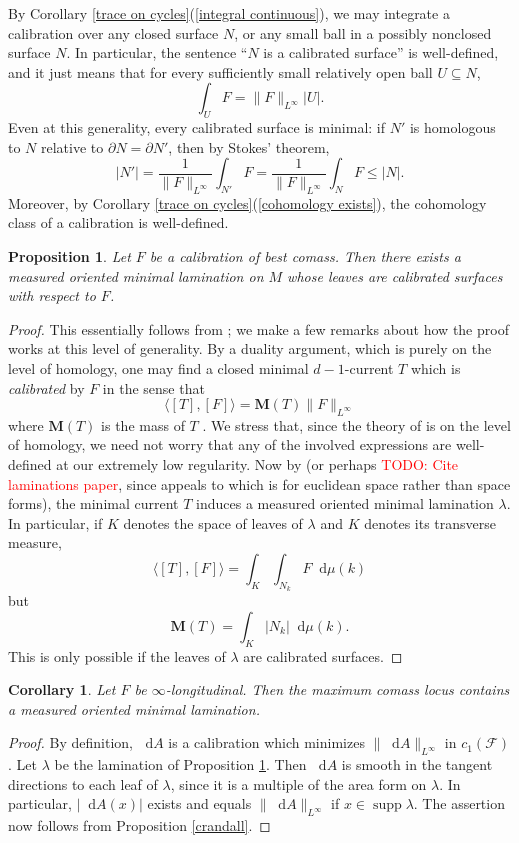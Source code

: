 \documentclass[reqno,11pt]{amsart}
\newcommand*\dif{\mathop{}\!\mathrm{d}}
\DeclareMathOperator{\supp}{supp}
\newcommand{\dfn}[1]{\emph{#1}\index{#1}}
\newtheorem{proposition}[theorem]{Proposition}
\newtheorem{corollary}[theorem]{Corollary}
\theoremstyle{definition}
\numberwithin{equation}{section}
\newcommand\todo[1]{\textcolor{red}{TODO: #1}}
\begin{document}
By Corollary \ref{trace on cycles}(\ref{integral continuous}), we may integrate a calibration over any closed surface $N$, or any small ball in a possibly nonclosed surface $N$.
In particular, the sentence ``$N$ is a calibrated surface'' is well-defined, and it just means that for every sufficiently small relatively open ball $U \subseteq N$,
$$\int_U F = \|F\|_{L^\infty} |U|.$$
Even at this generality, every calibrated surface is minimal: if $N'$ is homologous to $N$ relative to $\partial N = \partial N'$, then by Stokes' theorem,
$$|N'| = \frac{1}{\|F\|_{L^\infty}} \int_{N'} F = \frac{1}{\|F\|_{L^\infty}} \int_N F \leq |N|.$$
Moreover, by Corollary \ref{trace on cycles}(\ref{cohomology exists}), the cohomology class of a calibration is well-defined.

\begin{proposition}\label{Bangert Cui}
Let $F$ be a calibration of best comass.
Then there exists a measured oriented minimal lamination on $M$ whose leaves are calibrated surfaces with respect to $F$.
\end{proposition}
\begin{proof}
This essentially follows from \cite[Theorem 5.1]{bangert_cui_2017}; we make a few remarks about how the proof works at this level of generality.
By a duality argument, which is purely on the level of homology, one may find a closed minimal $d-1$-current $T$ which is \dfn{calibrated} by $F$ in the sense that
$$\langle [T], [F]\rangle = \mathbf M(T) \|F\|_{L^\infty}$$
where $\mathbf M(T)$ is the mass of $T$ \cite[Proposition 2.2]{bangert_cui_2017}.
We stress that, since the theory of \cite[\S2C]{bangert_cui_2017} is on the level of homology, we need not worry that any of the involved expressions are well-defined at our extremely low regularity.
Now by \cite[Theorem 1]{AUER20011095} (or perhaps \todo{Cite laminations paper}, since \cite{AUER20011095} appeals to \cite[\S37]{Simon84} which is for euclidean space rather than space forms), the minimal current $T$ induces a measured oriented minimal lamination $\lambda$.
In particular, if $K$ denotes the space of leaves of $\lambda$ and $K$ denotes its transverse measure,
$$\langle [T], [F]\rangle = \int_K \int_{N_k} F \dif \mu(k)$$
but 
$$\mathbf M(T) = \int_K |N_k| \dif \mu(k).$$
This is only possible if the leaves of $\lambda$ are calibrated surfaces.
\end{proof}

\begin{corollary}\label{best comass lamination}
Let $F$ be $\infty$-longitudinal.
Then the maximum comass locus contains a measured oriented minimal lamination.
\end{corollary}
\begin{proof}
By definition, $\dif A$ is a calibration which minimizes $\|\dif A\|_{L^\infty}$ in $c_1(\mathscr F)$.
Let $\lambda$ be the lamination of Proposition \ref{Bangert Cui}.
Then $\dif A$ is smooth in the tangent directions to each leaf of $\lambda$, since it is a multiple of the area form on $\lambda$.
In particular, $|\dif A(x)|$ exists and equals $\|\dif A\|_{L^\infty}$ if $x \in \supp \lambda$.
The assertion now follows from Proposition \ref{crandall}.
\end{proof}
\end{document}
